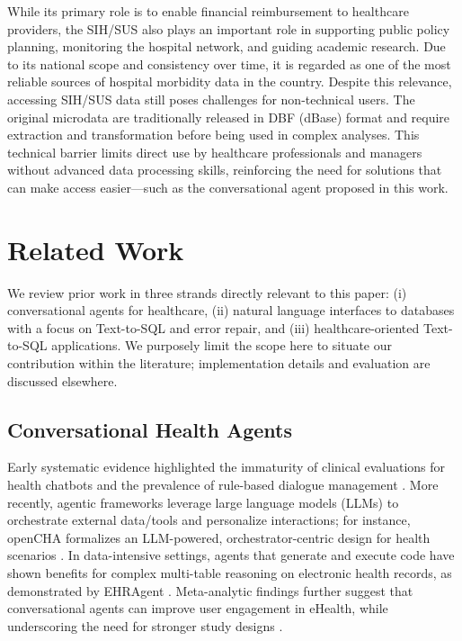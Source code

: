 \documentclass[sigconf,natbib=false]{acmart}
\begin{document}
While its primary role is to enable financial reimbursement to healthcare providers, the SIH/SUS also plays an important role in supporting public policy planning, monitoring the hospital network, and guiding academic research. Due to its national scope and consistency over time, it is regarded as one of the most reliable sources of hospital morbidity data in the country. Despite this relevance, accessing SIH/SUS data still poses challenges for non-technical users. The original microdata are traditionally released in DBF (dBase) format and require extraction and transformation before being used in complex analyses. This technical barrier limits direct use by healthcare professionals and managers without advanced data processing skills, reinforcing the need for solutions that can make access easier—such as the conversational agent proposed in this work.











\section{Related Work}
\label{sec:related}
We review prior work in three strands directly relevant to this paper: (i) conversational agents for healthcare, (ii) natural language interfaces to databases with a focus on Text-to-SQL and error repair, and (iii) healthcare-oriented Text-to-SQL applications. We purposely limit the scope here to situate our contribution within the literature; implementation details and evaluation are discussed elsewhere.

\subsection{Conversational Health Agents}
Early systematic evidence highlighted the immaturity of clinical evaluations for health chatbots and the prevalence of rule-based dialogue management \cite{laranjo2018}. More recently, agentic frameworks leverage large language models (LLMs) to orchestrate external data/tools and personalize interactions; for instance, openCHA formalizes an LLM-powered, orchestrator-centric design for health scenarios \cite{opencha2025}. In data-intensive settings, agents that generate and execute code have shown benefits for complex multi-table reasoning on electronic health records, as demonstrated by EHRAgent \cite{ehragent2024}. Meta-analytic findings further suggest that conversational agents can improve user engagement in eHealth, while underscoring the need for stronger study designs \cite{cevasco2024}.
\end{document}
